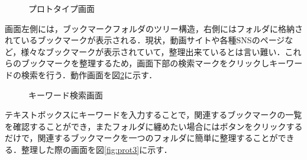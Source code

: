 \documentclass[a4paper,10pt,fleqn]{jsarticle}
\begin{document}
\begin{figure}[h]
  \begin{center}
    \caption{プロトタイプ画面}
    \label{fig:prot1}
  \end{center}
\end{figure}

画面左側には，ブックマークフォルダのツリー構造，右側にはフォルダに格納されているブックマークが表示される．現状，動画サイトや各種SNSのページなど，様々なブックマークが表示されていて，整理出来ているとは言い難い．これらのブックマークを整理するため，画面下部の検索マークをクリックしキーワードの検索を行う．動作画面を図\ref{fig:prot2}に示す．

\begin{figure}[h]
  \begin{center}
    \caption{キーワード検索画面}
    \label{fig:prot2}
  \end{center}
\end{figure}

テキストボックスにキーワードを入力することで，関連するブックマークの一覧を確認することができ，またフォルダに纏めたい場合にはボタンをクリックするだけで，関連するブックマークを一つのフォルダに簡単に整理することができる．整理した際の画面を図\ref{fig:prot3}に示す．
\end{document}
